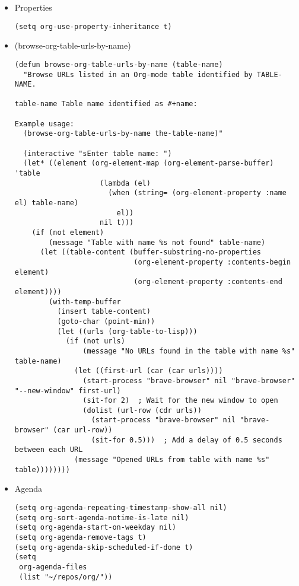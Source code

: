 \documentclass{article}
\begin{document}
\begin{itemize}
\begin{itemize}
\begin{itemize}
\begin{verbatim}
\end{verbatim}

\item Properties
\label{sec:orgefe0230}
\begin{verbatim}
(setq org-use-property-inheritance t)
\end{verbatim}
\item (browse-org-table-urls-by-name)
\label{sec:org3b0560a}

\begin{verbatim}
(defun browse-org-table-urls-by-name (table-name)
  "Browse URLs listed in an Org-mode table identified by TABLE-NAME.

table-name Table name identified as #+name:

Example usage:
  (browse-org-table-urls-by-name the-table-name)"

  (interactive "sEnter table name: ")
  (let* ((element (org-element-map (org-element-parse-buffer) 'table
                    (lambda (el)
                      (when (string= (org-element-property :name el) table-name)
                        el))
                    nil t)))
    (if (not element)
        (message "Table with name %s not found" table-name)
      (let ((table-content (buffer-substring-no-properties
                            (org-element-property :contents-begin element)
                            (org-element-property :contents-end element))))
        (with-temp-buffer
          (insert table-content)
          (goto-char (point-min))
          (let ((urls (org-table-to-lisp)))
            (if (not urls)
                (message "No URLs found in the table with name %s" table-name)
              (let ((first-url (car (car urls))))
                (start-process "brave-browser" nil "brave-browser" "--new-window" first-url)
                (sit-for 2)  ; Wait for the new window to open
                (dolist (url-row (cdr urls))
                  (start-process "brave-browser" nil "brave-browser" (car url-row))
                  (sit-for 0.5)))  ; Add a delay of 0.5 seconds between each URL
              (message "Opened URLs from table with name %s" table))))))))

\end{verbatim}

\item Agenda
\label{sec:org98c5d7c}
\begin{verbatim}
(setq org-agenda-repeating-timestamp-show-all nil)
(setq org-sort-agenda-notime-is-late nil)
(setq org-agenda-start-on-weekday nil)
(setq org-agenda-remove-tags t)
(setq org-agenda-skip-scheduled-if-done t)
(setq
 org-agenda-files
 (list "~/repos/org/"))


\end{verbatim}
\end{itemize}
\end{itemize}
\end{itemize}
\end{document}
